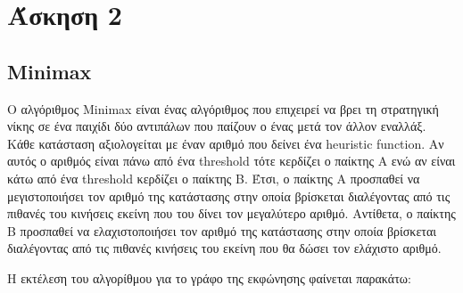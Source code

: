 \documentclass[a4paper,oneside, 11pt]{article}
\begin{document}
\section*{Άσκηση 2}

\subsection*{Minimax}
Ο αλγόριθμος Minimax είναι ένας αλγόριθμος που επιχειρεί να βρει τη στρατηγική νίκης σε ένα παιχίδι δύο αντιπάλων που παίζουν ο ένας μετά τον άλλον εναλλάξ. Κάθε κατάσταση αξιολογείται με έναν αριθμό που δείνει ένα heuristic function. Αν αυτός ο αριθμός είναι πάνω από ένα threshold τότε κερδίζει ο παίκτης Α ενώ αν είναι κάτω από ένα threshold κερδίζει ο παίκτης Β. Έτσι, ο παίκτης Α προσπαθεί να μεγιστοποιήσει τον αριθμό της κατάστασης στην οποία βρίσκεται διαλέγοντας από τις πιθανές του κινήσεις εκείνη που του δίνει τον μεγαλύτερο αριθμό. Αντίθετα, ο παίκτης Β προσπαθεί να ελαχιστοποιήσει τον αριθμό της κατάστασης στην οποία βρίσκεται διαλέγοντας από τις πιθανές κινήσεις του εκείνη που θα δώσει τον ελάχιστο αριθμό.
 
Η εκτέλεση του αλγορίθμου για το γράφο της εκφώνησης φαίνεται παρακάτω:
\end{document}
